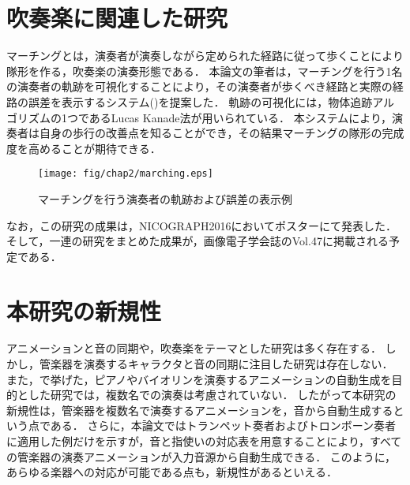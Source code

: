\section{吹奏楽に関連した研究} \label{sec:marching}
マーチングとは，演奏者が演奏しながら定められた経路に従って歩くことにより隊形を作る，吹奏楽の演奏形態である．
本論文の筆者は，マーチングを行う1名の演奏者の軌跡を可視化することにより，その演奏者が歩くべき経路と実際の経路の誤差を表示するシステム()を提案した．
軌跡の可視化には，物体追跡アルゴリズムの1つであるLucas Kanade法\cite{Lucas}が用いられている．
本システムにより，演奏者は自身の歩行の改善点を知ることができ，その結果マーチングの隊形の完成度を高めることが期待できる．
\begin{figure}[H]
	\centering
	\texttt{[image: fig/chap2/marching.eps]}
	\caption{マーチングを行う演奏者の軌跡および誤差の表示例}
	\label{fig:marching}
\end{figure}
なお，この研究の成果は，NICOGRAPH2016においてポスター\cite{nicograph}にて発表した．
そして，一連の研究をまとめた成果が，画像電子学会誌のVol.47\cite{iieej}に掲載される予定である．

\section{本研究の新規性}\label{sec:compere}
アニメーションと音の同期や，吹奏楽をテーマとした研究は多く存在する．
しかし，管楽器を演奏するキャラクタと音の同期に注目した研究は存在しない．
また，で挙げた，ピアノやバイオリンを演奏するアニメーションの自動生成を目的とした研究では，複数名での演奏は考慮されていない．
したがって本研究の新規性は，管楽器を複数名で演奏するアニメーションを，音から自動生成するという点である．
さらに，本論文ではトランペット奏者およびトロンボーン奏者に適用した例だけを示すが，音と指使いの対応表を用意することにより，すべての管楽器の演奏アニメーションが入力音源から自動生成できる．
このように，あらゆる楽器への対応が可能である点も，新規性があるといえる．
